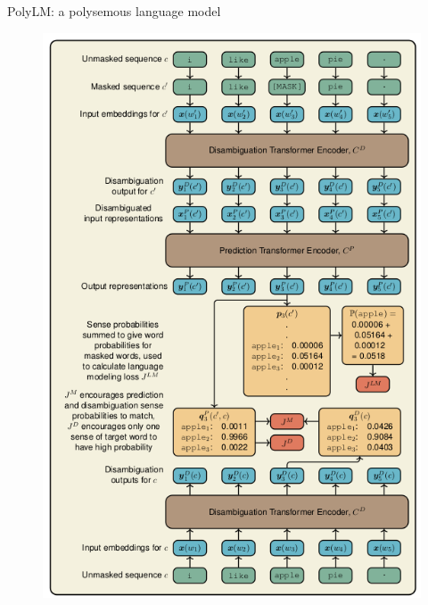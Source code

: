 \documentclass[handout]{beamer}
\begin{document}
\begin{frame}{PolyLM: a polysemous language model}

  \begin{figure}[h]
        	\includegraphics[scale = 0.29]{pics/polylm.png}
        \end{figure}


\end{frame}
\end{document}
